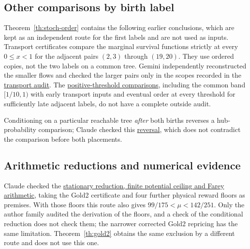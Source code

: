 \documentclass[11pt]{article}
\newcommand{\proofsrc}[2]{\href{https://github.com/uzay-eth/friend-tree-exponent/blob/a0972085ad72ad5685ae7b424988648d1965e73c/#1}{#2}}
\theoremstyle{remark}
\numberwithin{equation}{section}
\begin{document}
\subsection{Other comparisons by birth label}\label{sec:further-order}
Theorem~\ref{th:stoch-order} contains the following earlier conclusions, which are kept as an independent route for the first labels and are not used as inputs. Transport certificates compare the marginal survival functions strictly at every $0\le x<1$ for the adjacent pairs $(2,3)$ through $(19,20)$. They use ordered copies, not the two labels on a common tree. Gemini independently reconstructed the smaller flows and checked the larger pairs only in the scopes recorded in the \proofsrc{round2/reviews/attacks/neon-on-fable-5.md}{transport audit}. The \proofsrc{round2/proofs/astra-late/source/round2/open/age-order/README.md}{positive-threshold comparisons}, including the common band $[1/10,1)$ with early transport inputs and eventual order at every threshold for sufficiently late adjacent labels, do not have a complete outside audit.

Conditioning on a particular reachable tree \emph{after} both births reverses a hub-probability comparison; Claude checked this \proofsrc{round2/reviews/attacks/fable-on-astra-18.md}{reversal}, which does not contradict the comparison before both placements.

\subsection{Arithmetic reductions and numerical evidence}
Claude checked the \proofsrc{round2/proofs/astra-late/source/round2/occupation-quintet-gold2/rationals/repaired/README.md}{stationary reduction, finite potential ceiling and Farey arithmetic}, taking the Gold2 certificate and four further physical reward floors as premises. With those floors this route also gives $99/175<\mu<142/251$. Only the author family audited the derivation of the floors, and a check of the conditional reduction does not check them; the narrower corrected Gold2 repricing has the same limitation. Theorem~\ref{th:gold2} obtains the same exclusion by a different route and does not use this one.
\end{document}
